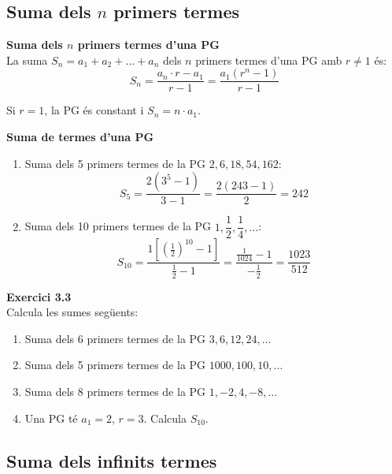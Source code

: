 \documentclass[12pt]{article}
\begin{document}
\subsection{Suma dels $n$ primers termes}

\begin{concept}
\textbf{Suma dels $n$ primers termes d'una PG}\\
La suma $S_n = a_1 + a_2 + \dots + a_n$ dels $n$ primers termes d'una PG amb $r \neq 1$ és:
\[
\boxed{S_n = \dfrac{a_n \cdot r - a_1}{r-1} = \dfrac{a_1 (r^n - 1)}{r-1}}
\]

Si $r = 1$, la PG és constant i $S_n = n \cdot a_1$.
\end{concept}

\begin{exemple}
\textbf{Suma de termes d'una PG}
\begin{enumerate}[label=\alph*)]
    \item Suma dels 5 primers termes de la PG $2, 6, 18, 54, 162$:
    \[
    S_5 = \dfrac{2(3^5 - 1)}{3-1} = \dfrac{2(243-1)}{2} = 242
    \]
    \item Suma dels 10 primers termes de la PG $1, \dfrac{1}{2}, \dfrac{1}{4}, \dots$:
    \[
    S_{10} = \dfrac{1\left[\left(\frac{1}{2}\right)^{10} - 1\right]}{\frac{1}{2}-1} = \dfrac{\frac{1}{1024}-1}{-\frac{1}{2}} = \dfrac{1023}{512}
    \]
\end{enumerate}
\end{exemple}

\begin{exercici}
\textbf{Exercici 3.3}\\
Calcula les sumes següents:
\begin{enumerate}[label=\alph*)]
    \item Suma dels 6 primers termes de la PG $3, 6, 12, 24, \dots$
    \item Suma dels 5 primers termes de la PG $1000, 100, 10, \dots$
    \item Suma dels 8 primers termes de la PG $1, -2, 4, -8, \dots$
    \item Una PG té $a_1 = 2$, $r = 3$. Calcula $S_{10}$.
\end{enumerate}
\end{exercici}

\subsection{Suma dels infinits termes}
\end{document}
